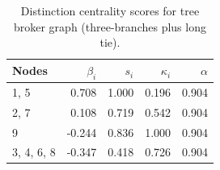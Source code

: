 \begin{table}
\centering
\caption{\label{tab:treelong3}Distinction centrality scores for tree broker graph (three-branches plus long tie).}
\centering
\begin{tabular}[t]{lrrrr}
\toprule
Nodes & $\beta_i$ & $s_i$ & $\kappa_i$ & $\alpha$\\
\midrule
1, 5 & 0.708 & 1.000 & 0.196 & 0.904\\
2, 7 & 0.108 & 0.719 & 0.542 & 0.904\\
9 & -0.244 & 0.836 & 1.000 & 0.904\\
3, 4, 6, 8 & -0.347 & 0.418 & 0.726 & 0.904\\
\bottomrule
\end{tabular}
\end{table}
